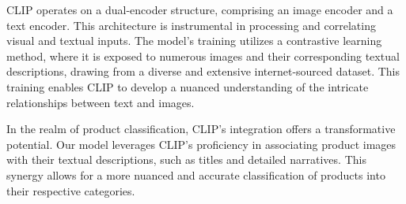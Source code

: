 CLIP operates on a dual-encoder structure, comprising an image encoder and a text encoder. This architecture is instrumental in processing and correlating visual and textual inputs. The model's training utilizes a contrastive learning method, where it is exposed to numerous images and their corresponding textual descriptions, drawing from a diverse and extensive internet-sourced dataset. This training enables CLIP to develop a nuanced understanding of the intricate relationships between text and images.

In the realm of product classification, CLIP's integration offers a transformative potential. Our model leverages CLIP's proficiency in associating product images with their textual descriptions, such as titles and detailed narratives. This synergy allows for a more nuanced and accurate classification of products into their respective categories.

